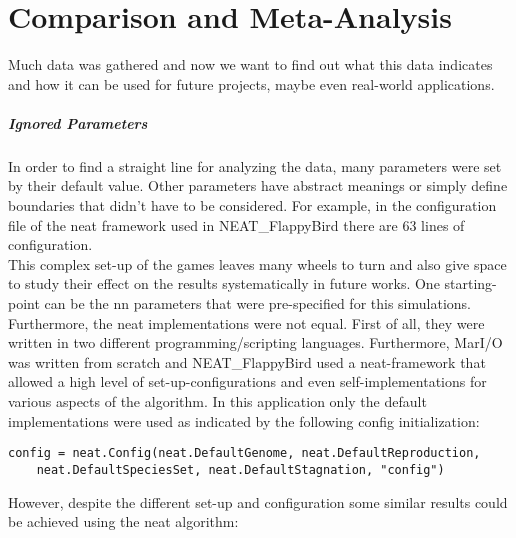 

\chapter{Comparison and Meta-Analysis}
\label{sec:compare}

Much data was gathered and now we want to find out what this data indicates and how it can be used for future projects, maybe even real-world applications. 

\paragraph{Ignored Parameters}
\label{sec:compare:params}	
	In order to find a straight line for analyzing the data, many parameters were set by their default value. Other parameters have abstract meanings or simply define boundaries that didn't have to be considered. For example, in the configuration file of the \gls{neat} framework used in NEAT\_FlappyBird there are 63 lines of configuration.\\
	This complex set-up of the games leaves many wheels to turn and also give space to study their effect on the results systematically in future works. One starting-point can be the \gls{nn} parameters that were pre-specified for this simulations.\\
	Furthermore, the \gls{neat} implementations were not equal. First of all, they were written in two different programming/scripting languages. Furthermore, MarI/O was written from scratch and NEAT\_FlappyBird used a \gls{neat}-framework that allowed a high level of set-up-configurations and even self-implementations for various aspects of the algorithm. In this application only the default implementations were used as indicated by the following config initialization:
	\lstset{style=myPythonstyle} 
	\begin{lstlisting}[basicstyle=\small]
	config = neat.Config(neat.DefaultGenome, neat.DefaultReproduction, 
	neat.DefaultSpeciesSet, neat.DefaultStagnation, "config") 
	\end{lstlisting}
	However, despite the different set-up and configuration some similar results could be achieved using the \gls{neat} algorithm:

